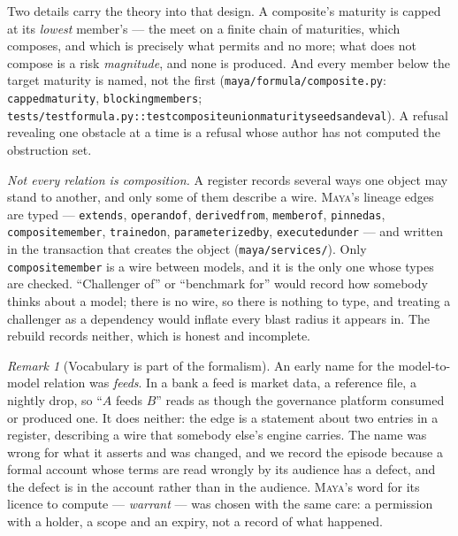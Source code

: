 \documentclass[11pt,a4paper]{article}
\renewcommand{\_}{\oldunderscore\allowbreak}
\theoremstyle{plain}
\theoremstyle{definition}
\theoremstyle{definition}
\theoremstyle{remark}
\newtheorem{remark}[theorem]{Remark}
\begin{document}
Two details carry the theory into that design. A composite's maturity is capped at its \emph{lowest}
member's --- the meet on a finite chain of maturities, which composes, and which is precisely what
 permits and no more; what does not compose is a risk \emph{magnitude}, and none is
produced. And every member below the target maturity is named, not the first
(\texttt{maya/formula/composite.py}: \texttt{capped\_maturity}, \texttt{blocking\_members};
\texttt{tests/test\_formula.py::test\_composite\_union\_maturity\_seeds\_and\_eval}). A refusal revealing one
obstacle at a time is a refusal whose author has not computed the obstruction set.

\emph{Not every relation is composition.} A register records several ways one object may stand to
another, and only some of them describe a wire. \textsc{Maya}'s lineage edges are typed ---
\texttt{extends}, \texttt{operand\_of}, \texttt{derived\_from}, \texttt{member\_of}, \texttt{pinned\_as},
\texttt{composite\_member}, \texttt{trained\_on}, \texttt{parameterized\_by}, \texttt{executed\_under} ---
and written in the transaction that creates the object (\texttt{maya/services/}). Only
\texttt{composite\_member} is a wire between models, and it is the only one whose types are checked.
``Challenger of'' or ``benchmark for'' would record how somebody thinks about a model; there is no wire,
so there is nothing to type, and treating a challenger as a dependency would inflate every blast radius
it appears in. The rebuild records neither, which is honest and incomplete.

\begin{remark}[Vocabulary is part of the formalism]\label{rem:naming}
An early name for the model-to-model relation was \emph{feeds}. In a bank a feed is market data, a
reference file, a nightly drop, so ``$A$ feeds $B$'' reads as though the governance platform consumed or
produced one. It does neither: the edge is a statement about two entries in a register, describing a wire
that somebody else's engine carries. The name was wrong for what it asserts and was changed, and we record
the episode because a formal account whose terms are read wrongly by its audience has a defect, and the
defect is in the account rather than in the audience. \textsc{Maya}'s word for its licence to compute ---
\emph{warrant} --- was chosen with the same care: a permission with a holder, a scope and an expiry, not a
record of what happened.
\end{remark}
\end{document}

